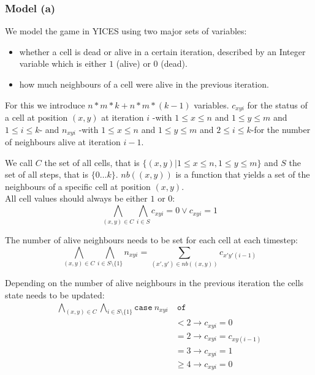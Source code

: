 \documentclass[12pt]{article}
\begin{document}
\subsubsection*{Model (a)}
We model the game in YICES using two major sets of variables:
\begin{itemize}
    \item whether a cell is dead or alive in a
        certain iteration, described by an Integer variable which is either 
        $1$ (alive) or $0$ (dead).
    \item how much neighbours of a cell were alive in the previous iteration.
\end{itemize}

For this we introduce $n*m*k + n*m*(k-1)$ variables. 
$c_{xyi}$ for the status of a cell
at position $(x,y)$ at iteration $i$ -with $1 \leq x \leq n$ and $1 \leq y 
\leq m$ and $1 \leq i \leq k$- and $n_{xyi}$ -with $1 \leq x \leq n$ and 
$1 \leq y \leq m$ and $2 \leq i \leq k$-for the number of neighbours
alive at iteration $i-1$. 

We call $C$ the set of all cells, that is 
$\{(x,y) | 1 \leq x \leq n, 1 \leq y \leq m\}$ and $S$ the
set of all steps, that is $\{0 \ldots k\}$. $nb((x,y))$ is a function that 
yields a set of the neighbours of a specific cell at position $(x,y)$.\\  

All cell values should always be either $1$ or $0$:
\begin{equation*}
    \bigwedge_{(x,y) \in C} \bigwedge_{i \in S} c_{xyi} = 0 \vee c_{xyi} = 1
\end{equation*}

\vspace{3mm}

The number of alive neighbours needs to be set for each cell at each timestep:
\begin{equation}
    \bigwedge_{(x,y) \in C} \bigwedge_{i \in S \setminus \{1\}} 
        n_{xyi} = \sum_{(x',y') \in nb((x,y))} c_{x'y'(i-1)}
\end{equation}

\vspace{3mm}

Depending on the number of alive neighbours in the previous iteration the
cells state needs to be updated:
\begin{equation}
\begin{aligned}
    \bigwedge_{(x,y) \in C} \bigwedge_{i \in S \setminus \{1\}} 
        \mathtt{case~} n_{xyi} &\mathtt{~of }\\   
        &< 2 \to c_{xyi} = 0\\  
        &= 2 \to c_{xyi} = c_{xy(i-1)}\\  
        &= 3 \to c_{xyi} = 1\\  
        &\geq 4 \to c_{xyi} = 0
\end{aligned}
\end{equation}
\end{document}
